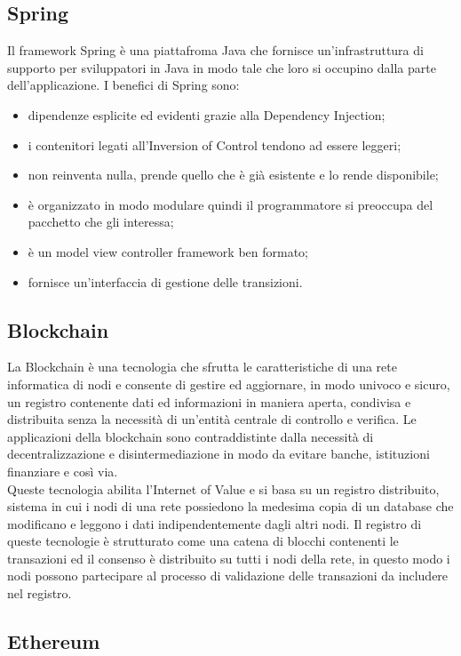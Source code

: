 \subsection{Spring}

Il framework Spring è una piattafroma Java che fornisce un'infrastruttura di supporto per sviluppatori in Java in modo tale che loro si occupino dalla parte dell'applicazione. I benefici di Spring sono:
\begin{itemize}
	\item dipendenze esplicite ed evidenti grazie alla Dependency Injection;
	\item i contenitori legati all'Inversion of Control tendono ad essere leggeri;
	\item non reinventa nulla, prende quello che è già esistente e lo rende disponibile;
	\item è organizzato in modo modulare quindi il programmatore si preoccupa del pacchetto che gli interessa;
	\item è un model view controller framework ben formato;
	\item fornisce un'interfaccia di gestione delle transizioni.
\end{itemize}

\subsection{Blockchain}

La Blockchain è una tecnologia che sfrutta le caratteristiche di una rete informatica di nodi e consente di gestire ed aggiornare, in modo univoco e sicuro, un registro contenente dati ed informazioni in maniera aperta, condivisa e distribuita senza la necessità di un'entità centrale di controllo e verifica. Le applicazioni della blockchain sono contraddistinte dalla necessità di decentralizzazione e disintermediazione in modo da evitare banche, istituzioni finanziare e così via.\\
Queste tecnologia abilita l'Internet of Value e si basa su un registro distribuito, sistema in cui i nodi di una rete possiedono la medesima copia di un database che modificano e leggono i dati indipendentemente dagli altri nodi. Il registro di queste tecnologie è strutturato come una catena di blocchi contenenti le transazioni ed il consenso è distribuito su tutti i nodi della rete, in questo modo i nodi possono partecipare al processo di validazione delle transazioni da includere nel registro.

\subsection{Ethereum}

